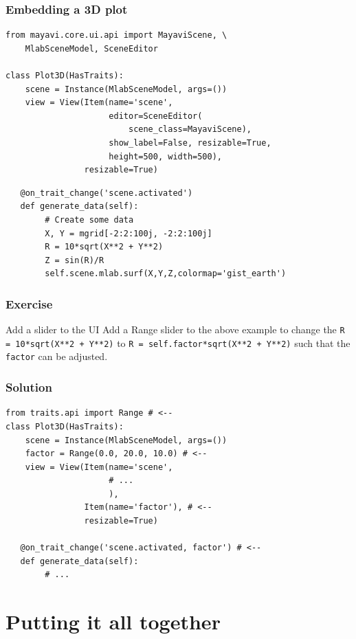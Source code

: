 \documentclass[14pt,compress]{beamer}
\newcommand{\typ}[1]{\lstinline{#1}}
\begin{document}
\begin{frame}
\frametitle{Embedding a 3D plot}
\footnotesize
\begin{lstlisting}
from mayavi.core.ui.api import MayaviScene, \
    MlabSceneModel, SceneEditor

class Plot3D(HasTraits):
    scene = Instance(MlabSceneModel, args=())
    view = View(Item(name='scene',
                     editor=SceneEditor(
                         scene_class=MayaviScene),
                     show_label=False, resizable=True,
                     height=500, width=500),
                resizable=True)
\end{lstlisting}
\pause
\begin{lstlisting}
   @on_trait_change('scene.activated')
   def generate_data(self):
        # Create some data
        X, Y = mgrid[-2:2:100j, -2:2:100j]
        R = 10*sqrt(X**2 + Y**2)
        Z = sin(R)/R
        self.scene.mlab.surf(X,Y,Z,colormap='gist_earth')
\end{lstlisting}
\end{frame}

\begin{frame}[plain]
    \frametitle{Exercise}
\normalsize
  \begin{block}{Add a slider to the UI}
      Add a Range slider to the above example to change the
       \typ{R = 10*sqrt(X**2 + Y**2)} to 
       \typ{R = self.factor*sqrt(X**2 + Y**2)}
       such that the \typ{factor} can be adjusted.
  \end{block}
\end{frame}

\begin{frame}
\frametitle{Solution}
\footnotesize
\begin{lstlisting}
from traits.api import Range # <--
class Plot3D(HasTraits):
    scene = Instance(MlabSceneModel, args=())
    factor = Range(0.0, 20.0, 10.0) # <--
    view = View(Item(name='scene', 
                     # ...
                     ),
                Item(name='factor'), # <--
                resizable=True)

   @on_trait_change('scene.activated, factor') # <--
   def generate_data(self):
        # ...
\end{lstlisting}
\end{frame}

\section{Putting it all together}
\end{document}
